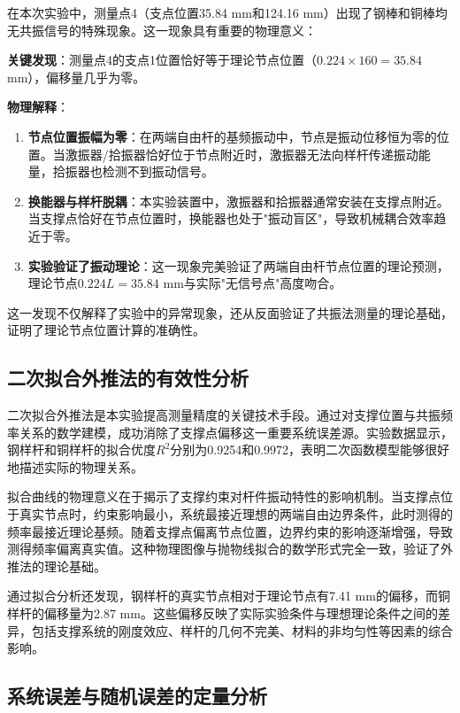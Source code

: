 ﻿\documentclass[12pt,a4paper]{article}
\begin{document}
在本次实验中，测量点4（支点位置35.84 mm和124.16 mm）出现了钢棒和铜棒均无共振信号的特殊现象。这一现象具有重要的物理意义：

\textbf{关键发现}：测量点4的支点1位置恰好等于理论节点位置（$0.224 \times 160 = 35.84$ mm），偏移量几乎为零。

\textbf{物理解释}：
\begin{enumerate}
    \item \textbf{节点位置振幅为零}：在两端自由杆的基频振动中，节点是振动位移恒为零的位置。当激振器/拾振器恰好位于节点附近时，激振器无法向样杆传递振动能量，拾振器也检测不到振动信号。
    \item \textbf{换能器与样杆脱耦}：本实验装置中，激振器和拾振器通常安装在支撑点附近。当支撑点恰好在节点位置时，换能器也处于"振动盲区"，导致机械耦合效率趋近于零。
    \item \textbf{实验验证了振动理论}：这一现象完美验证了两端自由杆节点位置的理论预测，理论节点$0.224L = 35.84$ mm与实际"无信号点"高度吻合。
\end{enumerate}

这一发现不仅解释了实验中的异常现象，还从反面验证了共振法测量的理论基础，证明了理论节点位置计算的准确性。

\subsection{二次拟合外推法的有效性分析}

二次拟合外推法是本实验提高测量精度的关键技术手段。通过对支撑位置与共振频率关系的数学建模，成功消除了支撑点偏移这一重要系统误差源。实验数据显示，钢样杆和铜样杆的拟合优度$R^2$分别为0.9254和0.9972，表明二次函数模型能够很好地描述实际的物理关系。

拟合曲线的物理意义在于揭示了支撑约束对杆件振动特性的影响机制。当支撑点位于真实节点时，约束影响最小，系统最接近理想的两端自由边界条件，此时测得的频率最接近理论基频。随着支撑点偏离节点位置，边界约束的影响逐渐增强，导致测得频率偏离真实值。这种物理图像与抛物线拟合的数学形式完全一致，验证了外推法的理论基础。

通过拟合分析还发现，钢样杆的真实节点相对于理论节点有7.41 mm的偏移，而铜样杆的偏移量为2.87 mm。这些偏移反映了实际实验条件与理想理论条件之间的差异，包括支撑系统的刚度效应、样杆的几何不完美、材料的非均匀性等因素的综合影响。

\subsection{系统误差与随机误差的定量分析}
\end{document}
